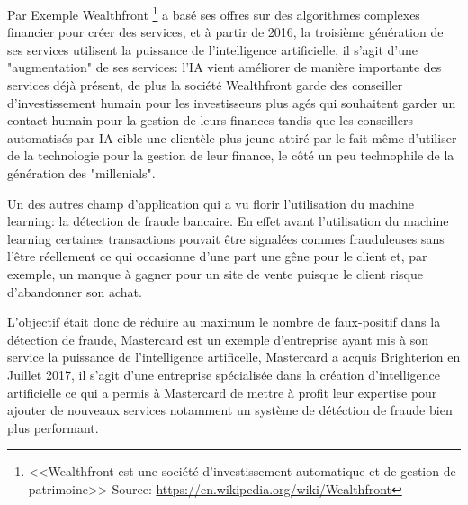 Par Exemple Wealthfront \footnote{<<Wealthfront est une société d'investissement automatique 
et de gestion de patrimoine>> \newline Source: \url{https://en.wikipedia.org/wiki/Wealthfront} }
a basé ses offres sur des algorithmes complexes financier pour créer des services,
et à partir de 2016, la troisième génération de ses services utilisent la puissance 
de l'intelligence artificielle, il s'agit d'une "augmentation" de ses services: 
l'IA vient améliorer de manière importante des services déjà présent, de plus 
la société Wealthfront garde des conseiller d'investissement humain 
pour les investisseurs plus agés qui souhaitent garder un contact humain pour
la gestion de leurs finances tandis que les conseillers automatisés par IA 
cible une clientèle plus jeune attiré par le fait même d'utiliser de la technologie 
pour la gestion de leur finance, le côté un peu technophile de la génération des "millenials". \newline

Un des autres champ d'application qui a vu florir l'utilisation du machine learning: 
la détection de fraude bancaire. En effet avant l'utilisation du machine learning 
certaines transactions pouvait être signalées commes frauduleuses sans l'être réellement 
ce qui occasionne d'une part une gêne pour le client et, par exemple, un manque à gagner pour 
un site de vente puisque le client risque d'abandonner son achat. \newline

L'objectif était donc de réduire au maximum le nombre de faux-positif dans 
la détection de fraude, Mastercard est un exemple d'entreprise ayant mis 
à son service la puissance de l'intelligence artificelle, Mastercard a
acquis Brighterion en Juillet 2017, il s'agit d'une entreprise spécialisée 
dans la création d'intelligence artificielle ce qui a permis à Mastercard de 
mettre à profit leur expertise pour ajouter de nouveaux services 
notamment un système de détéction de fraude bien plus performant. \newline

